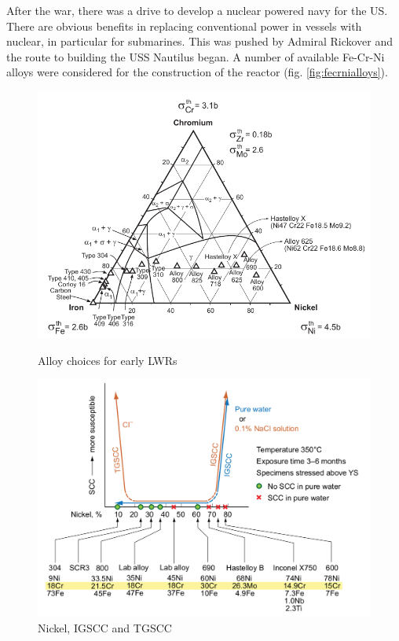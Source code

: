 After the war, there was a drive to develop a nuclear powered navy for the US.  There are obvious benefits in replacing conventional power in vessels with nuclear, in particular for submarines.  This was pushed by Admiral Rickover and the route to building the USS Nautilus began.  A number of available Fe-Cr-Ni alloys were considered for the construction of the reactor (fig. \ref{fig:fecrnialloys}).

\begin{figure}
\centering
\begin{minipage}{.46\textwidth}
\centering
    \includegraphics[width=.8\linewidth]{chapters/austenitic_steels_in_nuclear/images/fecrnialloys.png}
    \caption{Alloy choices for early LWRs}
    \label{fig:fecrnialloys}
\end{minipage}
\begin{minipage}{.05\textwidth}
\end{minipage}
\begin{minipage}{.46\textwidth}
\centering
    \includegraphics[width=.8\linewidth]{chapters/austenitic_steels_in_nuclear/images/tgscc_igscc_vs_nickel.png}
    \caption{Nickel, IGSCC and TGSCC}
    \label{fig:nitgsccigscc}
\end{minipage}
\end{figure}

